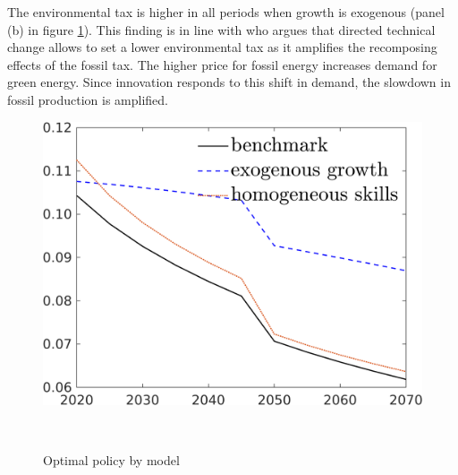 The environmental tax is higher in all periods when growth is exogenous (panel (b) in figure \ref{fig:comp_mod}). This finding is in line with \cite{Fried2018ClimateAnalysis} who argues that directed technical change allows to set a lower environmental tax as it amplifies the recomposing effects of the fossil tax. The higher price for fossil energy increases demand for green energy. Since innovation responds to this shift in demand, the slowdown in fossil production is amplified. 


\begin{figure}[h!!]
	\centering
	\caption{Optimal policy by model}\label{fig:comp_mod}
	
	\begin{minipage}[]{0.4\textwidth}
		\includegraphics[width=1\textwidth]{../../codding_model/own_basedOnFried/optimalPol_190722_tidiedUp/figures/all_10Aout22/CompMod1_OPT_T_NoTaus_taul_regime3_spillover0_noskill0_sep1_xgrowth0_extern0_PV1_etaa0.79_lgd1.png}
	\end{minipage}
	\begin{minipage}[]{0.1\textwidth}
		\
	\end{minipage}
	\begin{minipage}[]{0.4\textwidth}

\end{minipage}
\end{figure}
